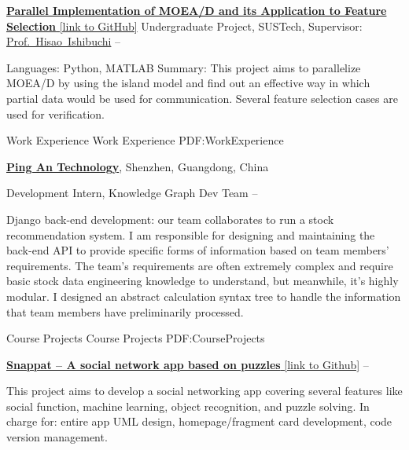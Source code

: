 \documentclass[a4paper,MMMyyyy,nonstopmode]{simpleresumecv}
\begin{document}
\begin{Body}
    \Entry
    \href{https://github.com/hackroid/pMOEA-D}
    {\textbf{Parallel Implementation of MOEA/D and its Application to Feature Selection} [link to GitHub]}
    \BulletItem
    Undergraduate Project, SUSTech, Supervisor: \href{https://hisaolab-sustech.github.io/}{Prof.~Hisao~Ishibuchi}
    \hfill
     --
    \begin{Detail}
        \SubBulletItem
        Languages: Python, MATLAB
        \SubBulletItem
        Summary:
        This project aims to parallelize MOEA/D by using the island model and find out an effective way in which partial data would be used for communication. Several feature selection cases are used for verification.
    \end{Detail}



    \Section
    {Work\newline
        Experience}
    {Work Experience}
    {PDF:WorkExperience}

    \Entry
    \href{https://tech.pingan.com/}
    {\textbf{Ping An Technology}},
    Shenzhen, Guangdong, China

    \BulletItem
    Development Intern,
    Knowledge Graph Dev Team
    \hfill
     --
    \begin{Detail}
        \SubBulletItem
        Django back-end development: our team collaborates to run a stock recommendation system. I am responsible for designing and maintaining the back-end API to provide specific forms of information based on team members' requirements. The team's requirements are often extremely complex and require basic stock data engineering knowledge to understand, but meanwhile, it's highly modular. I designed an abstract calculation syntax tree to handle the information that team members have preliminarily processed.
    \end{Detail}



    \Section
    {Course \newline
        Projects}
    {Course Projects}
    {PDF:CourseProjects}

    \BulletItem
    \href{https://github.com/hackroid/snappat}{\textbf{Snappat -- A social network app based on puzzles} [link to Github]}
    \hfill
     --
    \begin{Detail}
        \SubBulletItem
        This project aims to develop a social networking app covering several features like social function, machine learning, object recognition, and puzzle solving.
        \SubBulletItem
        In charge for: entire app UML design, homepage/fragment card development, code version management.
    \end{Detail}


\end{Body}
\end{document}

